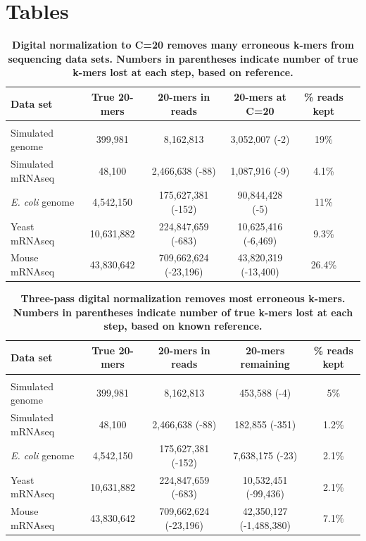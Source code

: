 \documentclass{pnastwo}
\begin{document}
\section*{Tables}

\begin{table}[!ht]
\caption{
\bf{Digital normalization to C=20 removes many erroneous k-mers from sequencing data sets.  Numbers
in parentheses indicate number of true k-mers lost at each step, based on reference.}}
\begin{tabular}{|l|c|c|c|c|c|}
Data set & True 20-mers & 20-mers in reads & 20-mers at C=20 & \% reads kept\\
\hline \\
Simulated genome & 399,981 & 8,162,813 & 3,052,007 (-2) & 19\% \\
Simulated mRNAseq & 48,100 & 2,466,638 (-88) & 1,087,916 (-9) & 4.1\% \\
{\em E. coli} genome & 4,542,150 & 175,627,381 (-152) & 90,844,428 (-5) & 11\% \\
Yeast mRNAseq & 10,631,882 & 224,847,659 (-683) & 10,625,416 (-6,469) & 9.3\% \\
Mouse mRNAseq & 43,830,642 & 709,662,624 (-23,196) & 43,820,319 (-13,400) & 26.4\% \\
\end{tabular}
\begin{flushleft}
\end{flushleft}
\label{tab:normC20}
\end{table}



\begin{table}[!ht]
\caption{
\bf{Three-pass digital normalization removes most erroneous k-mers.  Numbers
in parentheses indicate number of true k-mers lost at each step, based on known reference.}}
\begin{tabular}{|l|c|c|c|c|}
Data set & True 20-mers & 20-mers in reads & 20-mers remaining & \% reads kept\\
\hline \\
Simulated genome & 399,981 & 8,162,813 & 453,588 (-4) & 5\% \\
Simulated mRNAseq & 48,100 & 2,466,638 (-88) & 182,855 (-351) & 1.2\% \\
{\em E. coli} genome & 4,542,150 & 175,627,381 (-152) & 7,638,175 (-23) & 2.1\% \\
Yeast mRNAseq & 10,631,882 & 224,847,659 (-683) & 10,532,451 (-99,436) & 2.1\% \\
Mouse mRNAseq & 43,830,642 & 709,662,624 (-23,196) & 42,350,127 (-1,488,380) & 7.1\% \\
\end{tabular}
\begin{flushleft}
\end{flushleft}
\label{tab:normC5}
\end{table}
\end{document}
